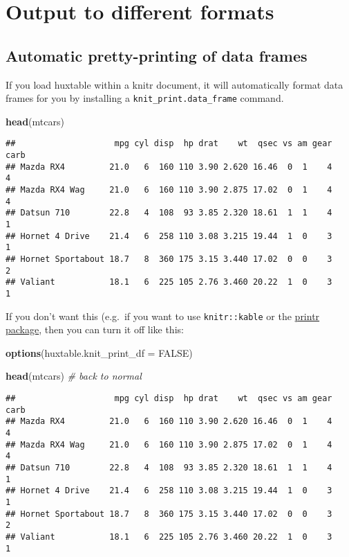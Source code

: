 \documentclass[]{article}
\newenvironment{Shaded}{\begin{snugshade}}{\end{snugshade}}
\newcommand{\KeywordTok}[1]{\textcolor[rgb]{0.13,0.29,0.53}{\textbf{#1}}}
\newcommand{\DataTypeTok}[1]{\textcolor[rgb]{0.13,0.29,0.53}{#1}}
\newcommand{\CommentTok}[1]{\textcolor[rgb]{0.56,0.35,0.01}{\textit{#1}}}
\newcommand{\OtherTok}[1]{\textcolor[rgb]{0.56,0.35,0.01}{#1}}
\newcommand{\NormalTok}[1]{#1}
\begin{document}
\section{Output to different formats}\label{output-to-different-formats}

\subsection{Automatic pretty-printing of data
frames}\label{automatic-pretty-printing-of-data-frames}

If you load huxtable within a knitr document, it will automatically
format data frames for you by installing a
\texttt{knit\_print.data\_frame} command.

\FloatBarrier

\begin{Shaded}
\begin{Highlighting}[]
\KeywordTok{head}\NormalTok{(mtcars)}
\end{Highlighting}
\end{Shaded}

\begin{verbatim}
##                    mpg cyl disp  hp drat    wt  qsec vs am gear carb
## Mazda RX4         21.0   6  160 110 3.90 2.620 16.46  0  1    4    4
## Mazda RX4 Wag     21.0   6  160 110 3.90 2.875 17.02  0  1    4    4
## Datsun 710        22.8   4  108  93 3.85 2.320 18.61  1  1    4    1
## Hornet 4 Drive    21.4   6  258 110 3.08 3.215 19.44  1  0    3    1
## Hornet Sportabout 18.7   8  360 175 3.15 3.440 17.02  0  0    3    2
## Valiant           18.1   6  225 105 2.76 3.460 20.22  1  0    3    1
\end{verbatim}

\FloatBarrier

If you don't want this (e.g.~if you want to use \texttt{knitr::kable} or
the
\href{https://cran.r-project.org/web/packages/printr/vignettes/printr.html}{printr
package}, then you can turn it off like this:

\begin{Shaded}
\begin{Highlighting}[]
\KeywordTok{options}\NormalTok{(}\DataTypeTok{huxtable.knit_print_df =} \OtherTok{FALSE}\NormalTok{)}

\KeywordTok{head}\NormalTok{(mtcars) }\CommentTok{# back to normal}
\end{Highlighting}
\end{Shaded}

\begin{verbatim}
##                    mpg cyl disp  hp drat    wt  qsec vs am gear carb
## Mazda RX4         21.0   6  160 110 3.90 2.620 16.46  0  1    4    4
## Mazda RX4 Wag     21.0   6  160 110 3.90 2.875 17.02  0  1    4    4
## Datsun 710        22.8   4  108  93 3.85 2.320 18.61  1  1    4    1
## Hornet 4 Drive    21.4   6  258 110 3.08 3.215 19.44  1  0    3    1
## Hornet Sportabout 18.7   8  360 175 3.15 3.440 17.02  0  0    3    2
## Valiant           18.1   6  225 105 2.76 3.460 20.22  1  0    3    1
\end{verbatim}
\end{document}
